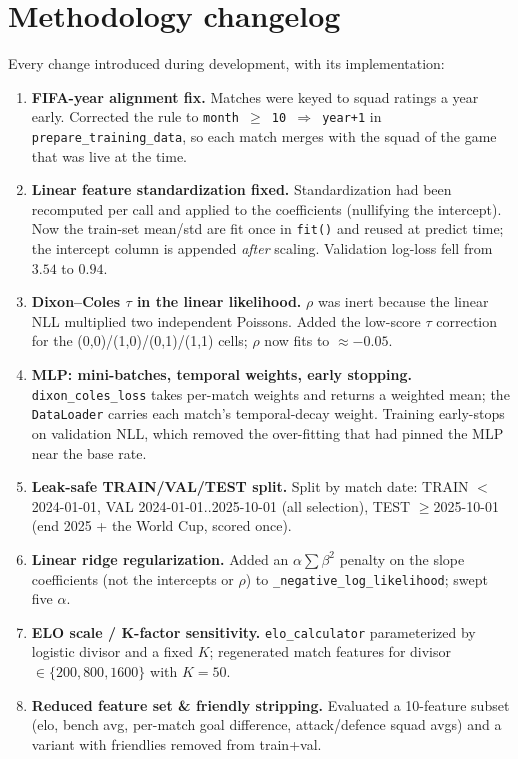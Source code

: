 \documentclass{article}
\begin{document}
\section*{Methodology changelog}
Every change introduced during development, with its implementation:
\begin{enumerate}
\item \textbf{FIFA-year alignment fix.} Matches were keyed to squad ratings a year early. Corrected the rule to \texttt{month $\geq$ 10 $\Rightarrow$ year+1} in \texttt{prepare\_training\_data}, so each match merges with the squad of the game that was live at the time.
\item \textbf{Linear feature standardization fixed.} Standardization had been recomputed per call and applied to the coefficients (nullifying the intercept). Now the train-set mean/std are fit once in \texttt{fit()} and reused at predict time; the intercept column is appended \emph{after} scaling. Validation log-loss fell from $3.54$ to $0.94$.
\item \textbf{Dixon--Coles $\tau$ in the linear likelihood.} $\rho$ was inert because the linear NLL multiplied two independent Poissons. Added the low-score $\tau$ correction for the (0,0)/(1,0)/(0,1)/(1,1) cells; $\rho$ now fits to $\approx -0.05$.
\item \textbf{MLP: mini-batches, temporal weights, early stopping.} \texttt{dixon\_coles\_loss} takes per-match weights and returns a weighted mean; the \texttt{DataLoader} carries each match's temporal-decay weight. Training early-stops on validation NLL, which removed the over-fitting that had pinned the MLP near the base rate.
\item \textbf{Leak-safe TRAIN/VAL/TEST split.} Split by match date: TRAIN $<$2024-01-01, VAL 2024-01-01..2025-10-01 (all selection), TEST $\geq$2025-10-01 (end 2025 + the World Cup, scored once).
\item \textbf{Linear ridge regularization.} Added an $\alpha\sum\beta^2$ penalty on the slope coefficients (not the intercepts or $\rho$) to \texttt{\_negative\_log\_likelihood}; swept five $\alpha$.
\item \textbf{ELO scale / K-factor sensitivity.} \texttt{elo\_calculator} parameterized by logistic divisor and a fixed $K$; regenerated match features for divisor $\in\{200,800,1600\}$ with $K=50$.
\item \textbf{Reduced feature set \& friendly stripping.} Evaluated a 10-feature subset (elo, bench avg, per-match goal difference, attack/defence squad avgs) and a variant with friendlies removed from train+val.

\end{enumerate}
\end{document}
